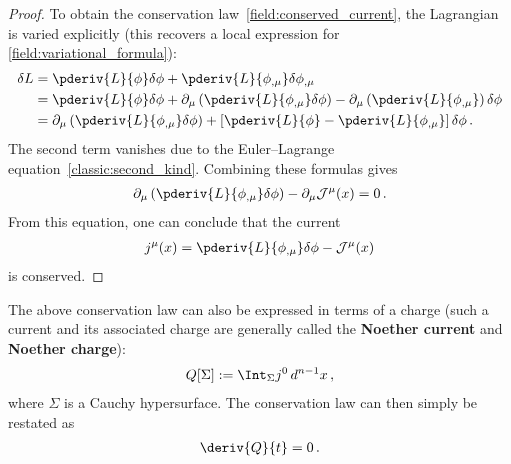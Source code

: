 \begin{theorem}
\begin{mdframed}[roundcorner=10pt, linecolor=blue, linewidth=1pt]
\begin{proof}
                To obtain the conservation law~\eqref{field:conserved_current}, the Lagrangian is varied explicitly (this recovers a local expression for \cref{field:variational_formula}):
                \begin{align*}
                    \delta L &= \pderiv{L}{\phi}\delta\phi + \pderiv{L}{\phi_{,\mu}}\delta\phi_{,\mu}\\
                    &= \pderiv{L}{\phi}\delta\phi + \partial_\mu\left(\pderiv{L}{\phi_{,\mu}}\delta\phi\right) - \partial_\mu\left(\pderiv{L}{\phi_{,\mu}}\right)\delta\phi\\
                    &= \partial_\mu\left(\pderiv{L}{\phi_{,\mu}}\delta\phi\right) + \left[\pderiv{L}{\phi} - \pderiv{L}{\phi_{,\mu}}\right]\delta\phi\,.
                \end{align*}
                The second term vanishes due to the Euler--Lagrange equation~\eqref{classic:second_kind}. Combining these formulas gives
                \begin{gather}
                    \partial_\mu\left(\pderiv{L}{\phi_{,\mu}}\delta\phi\right) - \partial_\mu\mathcal{J}^\mu(x) = 0\,.
                \end{gather}
                From this equation, one can conclude that the current
                \begin{gather}
                    j^\mu(x) = \pderiv{L}{\phi_{,\mu}}\delta\phi - \mathcal{J}^\mu(x)
                \end{gather}
                is conserved.
            \end{proof}
        \end{mdframed}
    \end{theorem}
    The above conservation law can also be expressed in terms of a charge (such a current and its associated charge are generally called the \textbf{Noether current} and \textbf{Noether charge}):
    \begin{gather}
        \label{field:noether_charge}
        Q[\Sigma] := \Int_\Sigma j^0\,d^{n-1}x\,,
    \end{gather}
    where $\Sigma$ is a Cauchy hypersurface. The conservation law can then simply be restated as
    \begin{gather}
        \deriv{Q}{t} = 0\,.
    \end{gather}

